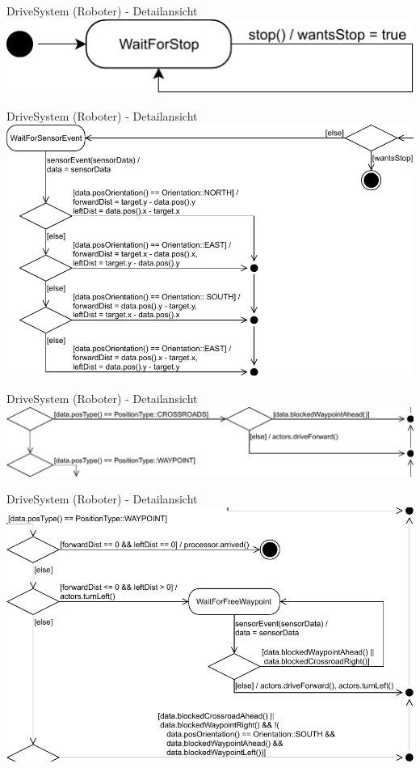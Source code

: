 \documentclass{beamer}
\begin{document}
\begin{frame}{DriveSystem (Roboter) - Detailansicht}
\centering
\includegraphics[width=\linewidth]{PDF/DriveSystem4.pdf}
\end{frame}
\begin{frame}{DriveSystem (Roboter) - Detailansicht}
\centering
\includegraphics[height=0.75\textheight]{PDF/DriveSystem5.pdf}
\end{frame}
\begin{frame}{DriveSystem (Roboter) - Detailansicht}
\centering
\includegraphics[width=\linewidth]{PDF/DriveSystem6.pdf}
\end{frame}
\begin{frame}{DriveSystem (Roboter) - Detailansicht}
\centering
\includegraphics[height=0.75\textheight]{PDF/DriveSystem7.pdf}
\end{frame}
\end{document}

